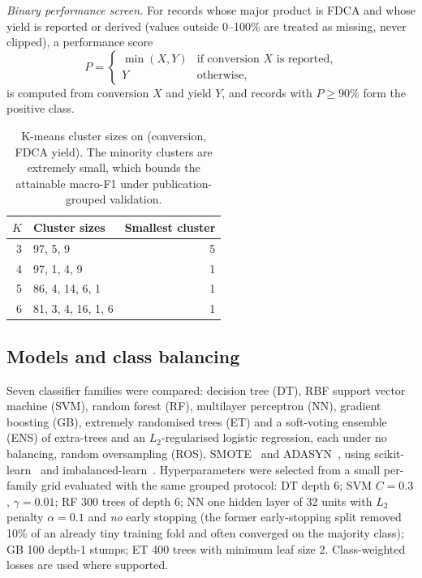\documentclass[11pt,a4paper]{article}
\begin{document}
\textit{Binary performance screen.} For records whose major product is FDCA and whose yield is
reported or derived (values outside 0--100\% are treated as missing, never clipped), a performance score
\begin{equation}
P = \begin{cases} \min(X, Y) & \text{if conversion } X \text{ is reported,}\\ Y & \text{otherwise,}\end{cases}
\end{equation}
is computed from conversion $X$ and yield $Y$, and records with $P\geq 90\%$ form the positive class.
\begin{table}[!htbp]
\centering
\caption{K-means cluster sizes on (conversion, FDCA yield). The minority clusters are extremely small, which bounds the attainable macro-F1 under publication-grouped validation.}
\label{tab:clusters}
\begin{tabular}{rlr}
\toprule
$K$ & Cluster sizes & Smallest cluster \\
\midrule
3 & 97, 5, 9 & 5 \\
4 & 97, 1, 4, 9 & 1 \\
5 & 86, 4, 14, 6, 1 & 1 \\
6 & 81, 3, 4, 16, 1, 6 & 1 \\
\bottomrule
\end{tabular}
\end{table}
\subsection{Models and class balancing}
Seven classifier families were compared: decision tree (DT), RBF support vector machine (SVM),
random forest (RF), multilayer perceptron (NN), gradient boosting (GB), extremely randomised
trees (ET) and a soft-voting ensemble (ENS) of extra-trees and an $L_2$-regularised logistic
regression, each under no balancing, random oversampling (ROS), SMOTE~\cite{chawla2002} and
ADASYN~\cite{he2008}, using scikit-learn~\cite{pedregosa2011} and
imbalanced-learn~\cite{lemaitre2017}. Hyperparameters were selected from a small per-family grid
evaluated with the same grouped protocol: DT depth 6; SVM $C=0.3$, $\gamma=0.01$; RF 300 trees of
depth 6; NN one hidden layer of 32 units with $L_2$ penalty $\alpha=0.1$ and \emph{no} early
stopping (the former early-stopping split removed 10\% of an already tiny training fold and often
converged on the majority class); GB 100 depth-1 stumps; ET 400 trees with minimum leaf size 2.
Class-weighted losses are used where supported.
\end{document}

